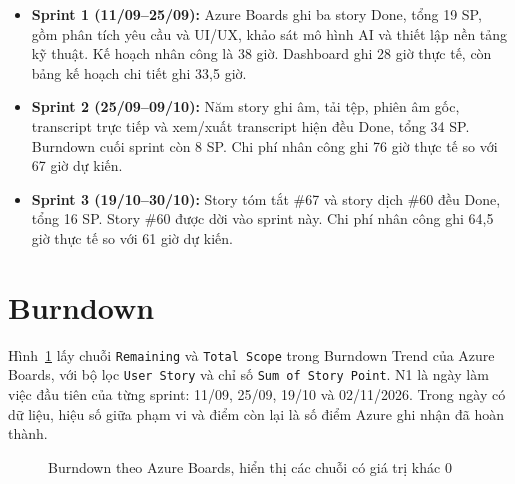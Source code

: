 \documentclass[12pt,a4paper]{report}
\begin{document}
\begin{itemize}
  \item \textbf{Sprint 1 (11/09--25/09):} Azure Boards ghi ba story Done, tổng 19 SP, gồm phân tích yêu cầu
    và UI/UX, khảo sát mô hình AI và thiết lập nền tảng kỹ thuật. Kế hoạch nhân công là 38 giờ. Dashboard
    ghi 28 giờ thực tế, còn bảng kế hoạch chi tiết ghi 33,5 giờ.
  \item \textbf{Sprint 2 (25/09--09/10):} Năm story ghi âm, tải tệp, phiên âm gốc, transcript trực tiếp và
    xem/xuất transcript hiện đều Done, tổng 34 SP. Burndown cuối sprint còn 8 SP. Chi phí nhân công ghi
    76 giờ thực tế so với 67 giờ dự kiến.
  \item \textbf{Sprint 3 (19/10--30/10):} Story tóm tắt \#67 và story dịch \#60 đều Done, tổng 16 SP.
    Story \#60 được dời vào sprint này. Chi phí nhân công ghi 64,5 giờ thực tế so với 61 giờ dự kiến.
\end{itemize}

\section{Burndown}
\label{sec:burndown}

Hình~\ref{fig:burndown} lấy chuỗi \texttt{Remaining} và \texttt{Total Scope} trong Burndown Trend của Azure
Boards, với bộ lọc \texttt{User Story} và chỉ số \texttt{Sum of Story Point}. N1 là ngày làm việc đầu
tiên của từng sprint: 11/09, 25/09, 19/10 và 02/11/2026. Trong ngày có dữ liệu, hiệu số giữa phạm vi và điểm còn lại
là số điểm Azure ghi nhận đã hoàn thành.

\begin{figure}[htbp]
  \centering
  \caption{Burndown theo Azure Boards, hiển thị các chuỗi có giá trị khác 0}
  \label{fig:burndown}
\end{figure}
\end{document}
